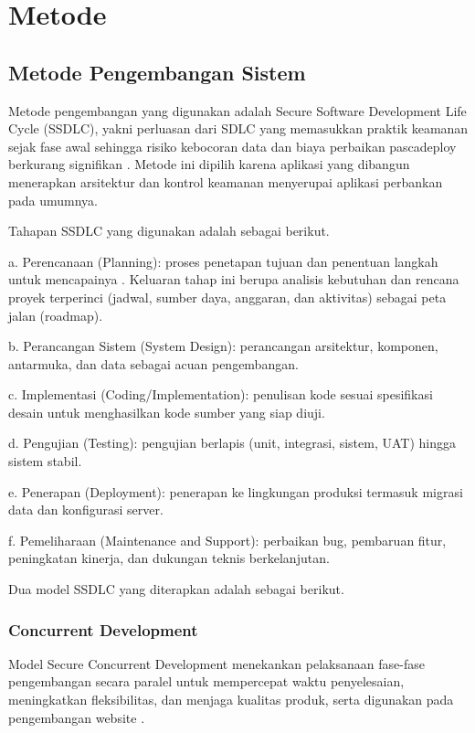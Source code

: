 \documentclass[conference, compsoc, twoside]{IEEEtran}
\begin{document}
\section{Metode}
\subsection{Metode Pengembangan Sistem}
Metode pengembangan yang digunakan adalah Secure Software Development Life Cycle (SSDLC), yakni perluasan dari SDLC yang memasukkan praktik keamanan sejak fase awal sehingga risiko kebocoran data dan biaya perbaikan pascadeploy berkurang signifikan \cite{Riley2024}. Metode ini dipilih karena aplikasi yang dibangun menerapkan arsitektur dan kontrol keamanan menyerupai aplikasi perbankan pada umumnya.

Tahapan SSDLC yang digunakan adalah sebagai berikut.

\noindent a. Perencanaan (Planning): proses penetapan tujuan dan penentuan langkah untuk mencapainya \cite{Arifudin2021}. Keluaran tahap ini berupa analisis kebutuhan dan rencana proyek terperinci (jadwal, sumber daya, anggaran, dan aktivitas) sebagai peta jalan (roadmap).

\noindent b. Perancangan Sistem (System Design): perancangan arsitektur, komponen, antarmuka, dan data sebagai acuan pengembangan.

\noindent c. Implementasi (Coding/Implementation): penulisan kode sesuai spesifikasi desain untuk menghasilkan kode sumber yang siap diuji.

\noindent d. Pengujian (Testing): pengujian berlapis (unit, integrasi, sistem, UAT) hingga sistem stabil.

\noindent e. Penerapan (Deployment): penerapan ke lingkungan produksi termasuk migrasi data dan konfigurasi server.

\noindent f. Pemeliharaan (Maintenance and Support): perbaikan bug, pembaruan fitur, peningkatan kinerja, dan dukungan teknis berkelanjutan.

Dua model SSDLC yang diterapkan adalah sebagai berikut.

\subsubsection{Concurrent Development}
Model Secure Concurrent Development menekankan pelaksanaan fase-fase pengembangan secara paralel untuk mempercepat waktu penyelesaian, meningkatkan fleksibilitas, dan menjaga kualitas produk, serta digunakan pada pengembangan website \cite{GeeksforGeeks2024}.
\end{document}
